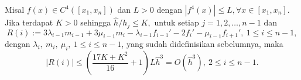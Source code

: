 \begin{lemma}\label{3.2.2}
    Misal $f(x) \in C^4([x_1,x_n])$ dan $L>0$ dengan $|f^4(x)|\leq L, \forall x \in [x_1,x_n]$. Jika terdapat $K>0$ sehingga $\hat{h}/h_j\leq K,$ untuk setiap $ j=1,2,\dots,n-1$ dan
    \begin{equation}
        R(i) := 3\lambda_{i-1}m_{i-1} + 3\mu_{i-1}m_i - \lambda_{i-1}f_{i-1}' - 2f_i' - \mu_{i-1}f_{i+1}',~1\leq i \leq n-1,
    \end{equation}
    dengan $\lambda_i,\:m_i,\:\mu_i,\:1 \leq i \leq n-1$, yang sudah didefinisikan sebelumnya, maka
    \begin{equation}
        |R(i)| \leq \left( \frac{17K + K^2}{16} + 1 \right)L\hat{h}^3 = O(\hat{h}^3),~2 \leq i \leq n-1.
    \end{equation}
\end{lemma}
